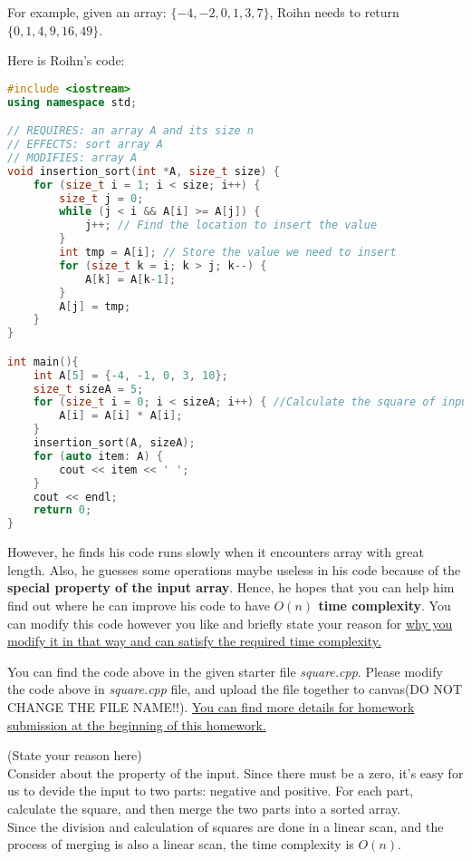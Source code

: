 \documentclass[11pt]{exam}
\begin{document}
For example, given an array: $\{-4,-2,0,1,3,7\}$, Roihn needs to return $\{0,1,4,9,16,49\}$.

Here is Roihn's code:
\begin{lstlisting}[language=c++]
#include <iostream>
using namespace std;

// REQUIRES: an array A and its size n
// EFFECTS: sort array A
// MODIFIES: array A
void insertion_sort(int *A, size_t size) {
    for (size_t i = 1; i < size; i++) {
        size_t j = 0;
        while (j < i && A[i] >= A[j]) {
            j++; // Find the location to insert the value
        }
        int tmp = A[i]; // Store the value we need to insert
        for (size_t k = i; k > j; k--) {
            A[k] = A[k-1];
        }
        A[j] = tmp;
    }
}

int main(){
    int A[5] = {-4, -1, 0, 3, 10};
    size_t sizeA = 5;
    for (size_t i = 0; i < sizeA; i++) { //Calculate the square of input array
        A[i] = A[i] * A[i];
    }
    insertion_sort(A, sizeA);
    for (auto item: A) {
        cout << item << ' ';
    }
    cout << endl;
    return 0;
}
\end{lstlisting}

However, he finds his code runs slowly when it encounters array with great length. Also, he guesses some operations maybe useless in his code because of the \textbf{special property of the input array}. Hence, he hopes that you can help him find out where he can improve his code to have \textbf{$O(n)$ time complexity}. You can modify this code however you like and briefly state your reason for \underline{why you modify it in that way and can satisfy the required time complexity.}

You can find the code above in the given starter file \textit{square.cpp}. Please modify the code above in \textit{square.cpp} file, and upload the file together to canvas(DO NOT CHANGE THE FILE NAME!!). \underline{You can find more details for homework submission at the beginning of this homework.}
\begin{solution}
(State your reason here) \\
Consider about the property of the input. Since there must be a zero, it's easy for us to devide the input to two parts: negative and positive. For each part, calculate the square, and then merge the two parts into a sorted array. \\
Since the division and calculation of squares are done in a linear scan, and the process of merging is also a linear scan, the time complexity is $O(n)$.
\end{solution}
\end{document}
